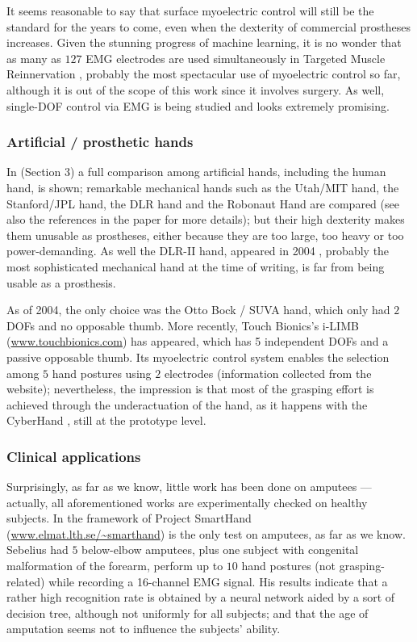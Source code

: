 It seems reasonable to say that surface myoelectric control will still be the standard for the
years to come, even when the dexterity of commercial prostheses increases. Given the
stunning progress of machine learning, it is no wonder that as many as $127$ EMG
electrodes are used simultaneously in Targeted
Muscle Reinnervation \cite{kuiken06}, probably the most spectacular use of myoelectric control
so far, although it is out of the scope of this work since it involves surgery.
As well, single-DOF control via EMG is being studied \cite{englehart08} and looks extremely
promising.

\subsubsection{Artificial / prosthetic hands}

In \cite{zecca02} (Section 3) a full comparison among artificial hands, including
the human hand, is shown; remarkable mechanical hands such as the Utah/MIT hand, the
Stanford/JPL hand, the DLR hand and the Robonaut Hand are compared (see also the
references in the paper for more details); but their high dexterity makes them
unusable as prostheses, either because they are too large, too heavy or too power-demanding.
As well the DLR-II hand, appeared in 2004 \cite{ButFisGre2004}, probably the most sophisticated
mechanical hand at the time of writing, is far from being usable as a prosthesis.

As of 2004, the only choice was the Otto Bock / SUVA hand, which only had $2$ DOFs and
no opposable thumb. More recently, Touch Bionics's i-LIMB (\url{www.touchbionics.com}) has appeared, which has
5 independent DOFs and a passive opposable thumb. Its myoelectric control system enables
the selection among $5$ hand postures using $2$ electrodes (information collected from the
website); nevertheless, the impression is that most of the grasping effort is achieved through
the underactuation of the hand, as it happens with the CyberHand \cite{cyberhand}, still at
the prototype level.

\subsubsection{Clinical applications}

Surprisingly, as far as we know, little work has been done on amputees --- actually,
all aforementioned works are experimentally checked on healthy subjects. In the framework of
Project SmartHand (\url{www.elmat.lth.se/~smarthand}) \cite{sebelius} is the only
test on amputees, as far as we know. Sebelius had $5$ below-elbow amputees, plus one subject
with congenital malformation of the forearm, perform up to
$10$ hand postures (not grasping-related) while recording a 16-channel EMG signal. His
results indicate that a rather high recognition rate is obtained by a neural network
aided by a sort of decision tree, although not uniformly for all subjects; and that
the age of amputation seems not to influence the subjects' ability.

